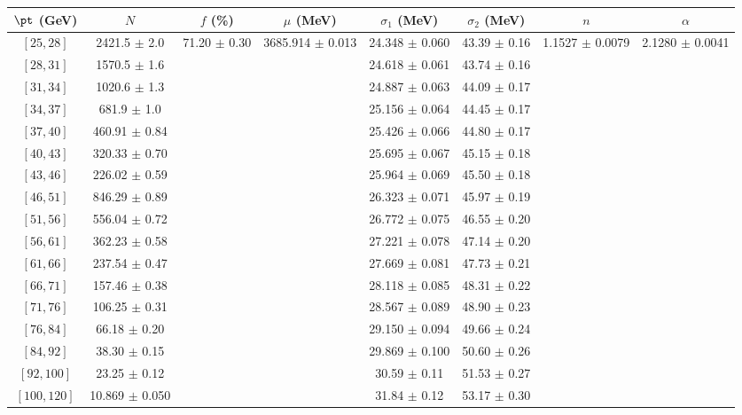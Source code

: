 \begin{tabular}{c||c|c|c|c|c|c|c}
$\pt$ (GeV) & $N$ & $f$ (\%) & $\mu$ (MeV) & $\sigma_1$ (MeV) & $\sigma_2$ (MeV) & $n$ & $\alpha$ \\
\hline
$[25, 28]$ & 2421.5 $\pm$ 2.0 & \multirow{17}{*}{71.20 $\pm$ 0.30} & \multirow{17}{*}{3685.914 $\pm$ 0.013} & 24.348 $\pm$ 0.060 & 43.39 $\pm$ 0.16 & \multirow{17}{*}{1.1527 $\pm$ 0.0079} & \multirow{17}{*}{2.1280 $\pm$ 0.0041}\\
$[28, 31]$ & 1570.5 $\pm$ 1.6 &  &  & 24.618 $\pm$ 0.061 & 43.74 $\pm$ 0.16 &  & \\
$[31, 34]$ & 1020.6 $\pm$ 1.3 &  &  & 24.887 $\pm$ 0.063 & 44.09 $\pm$ 0.17 &  & \\
$[34, 37]$ & 681.9 $\pm$ 1.0 &  &  & 25.156 $\pm$ 0.064 & 44.45 $\pm$ 0.17 &  & \\
$[37, 40]$ & 460.91 $\pm$ 0.84 &  &  & 25.426 $\pm$ 0.066 & 44.80 $\pm$ 0.17 &  & \\
$[40, 43]$ & 320.33 $\pm$ 0.70 &  &  & 25.695 $\pm$ 0.067 & 45.15 $\pm$ 0.18 &  & \\
$[43, 46]$ & 226.02 $\pm$ 0.59 &  &  & 25.964 $\pm$ 0.069 & 45.50 $\pm$ 0.18 &  & \\
$[46, 51]$ & 846.29 $\pm$ 0.89 &  &  & 26.323 $\pm$ 0.071 & 45.97 $\pm$ 0.19 &  & \\
$[51, 56]$ & 556.04 $\pm$ 0.72 &  &  & 26.772 $\pm$ 0.075 & 46.55 $\pm$ 0.20 &  & \\
$[56, 61]$ & 362.23 $\pm$ 0.58 &  &  & 27.221 $\pm$ 0.078 & 47.14 $\pm$ 0.20 &  & \\
$[61, 66]$ & 237.54 $\pm$ 0.47 &  &  & 27.669 $\pm$ 0.081 & 47.73 $\pm$ 0.21 &  & \\
$[66, 71]$ & 157.46 $\pm$ 0.38 &  &  & 28.118 $\pm$ 0.085 & 48.31 $\pm$ 0.22 &  & \\
$[71, 76]$ & 106.25 $\pm$ 0.31 &  &  & 28.567 $\pm$ 0.089 & 48.90 $\pm$ 0.23 &  & \\
$[76, 84]$ & 66.18 $\pm$ 0.20 &  &  & 29.150 $\pm$ 0.094 & 49.66 $\pm$ 0.24 &  & \\
$[84, 92]$ & 38.30 $\pm$ 0.15 &  &  & 29.869 $\pm$ 0.100 & 50.60 $\pm$ 0.26 &  & \\
$[92, 100]$ & 23.25 $\pm$ 0.12 &  &  & 30.59 $\pm$ 0.11 & 51.53 $\pm$ 0.27 &  & \\
$[100, 120]$ & 10.869 $\pm$ 0.050 &  &  & 31.84 $\pm$ 0.12 & 53.17 $\pm$ 0.30 &  & \\
\end{tabular}
